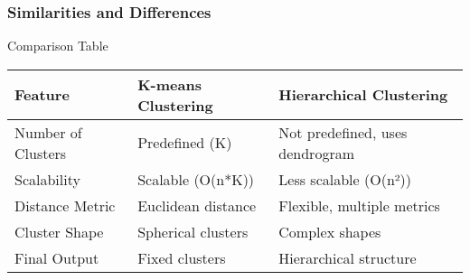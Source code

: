 \documentclass[aspectratio=169]{beamer}
\begin{document}
\begin{frame}[fragile]
    \frametitle{Similarities and Differences}
    \begin{block}{Comparison Table}
        \begin{tabular}{|l|l|l|}
        \hline
        \textbf{Feature} & \textbf{K-means Clustering} & \textbf{Hierarchical Clustering} \\
        \hline
        Number of Clusters & Predefined (K) & Not predefined, uses dendrogram \\
        Scalability & Scalable (O(n*K)) & Less scalable (O(n²)) \\
        Distance Metric & Euclidean distance & Flexible, multiple metrics \\
        Cluster Shape & Spherical clusters & Complex shapes \\
        Final Output & Fixed clusters & Hierarchical structure \\
        \hline
        \end{tabular}
    \end{block}
\end{frame}
\end{document}
